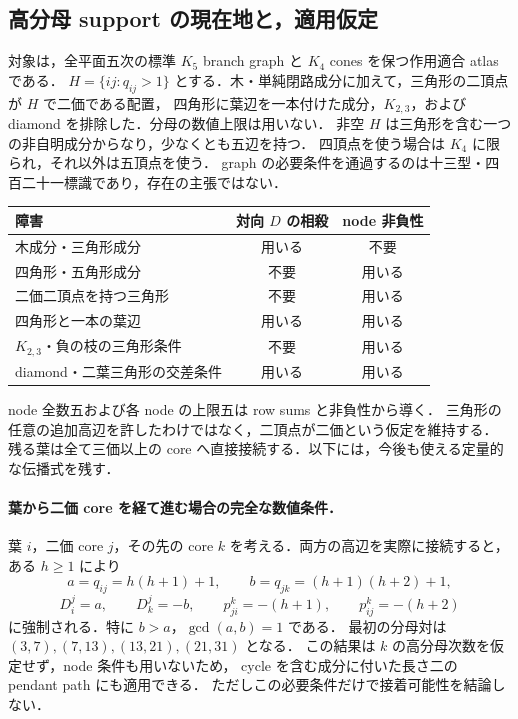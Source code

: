 \subsection{高分母 support の現在地と，適用仮定}
\label{ns15:current-support}

対象は，全平面五次の標準 $K_5$ branch graph と $K_4$ cones を保つ作用適合 atlas である．
$H=\{ij:q_{ij}>1\}$ とする．木・単純閉路成分に加えて，三角形の二頂点が $H$ で二価である配置，
四角形に葉辺を一本付けた成分，$K_{2,3}$，および diamond を排除した．分母の数値上限は用いない．
非空 $H$ は三角形を含む一つの非自明成分からなり，少なくとも五辺を持つ．
四頂点を使う場合は $K_4$ に限られ，それ以外は五頂点を使う．
graph の必要条件を通過するのは十三型・四百二十一標識であり，存在の主張ではない．

\begin{center}
\begin{tabular}{lcc}
障害 & 対向 $D$ の相殺 & node 非負性\\\hline
木成分・三角形成分 & 用いる & 不要\\
四角形・五角形成分 & 不要 & 用いる\\
二価二頂点を持つ三角形 & 不要 & 用いる\\
四角形と一本の葉辺 & 用いる & 用いる\\
$K_{2,3}$・負の枝の三角形条件 & 不要 & 用いる\\
diamond・二葉三角形の交差条件 & 用いる & 用いる
\end{tabular}
\end{center}
node 全数五および各 node の上限五は row sums と非負性から導く．
三角形の任意の追加高辺を許したわけではなく，二頂点が二価という仮定を維持する．
残る葉は全て三価以上の core へ直接接続する．以下には，今後も使える定量的な伝播式を残す．

\paragraph{葉から二価 core を経て進む場合の完全な数値条件．}
葉 $i$，二価 core $j$，その先の core $k$ を考える．両方の高辺を実際に接続すると，
ある $h\geq1$ により
\[
 a=q_{ij}=h(h+1)+1,\qquad b=q_{jk}=(h+1)(h+2)+1,
\]
\[
 D^j_i=a,\qquad D^j_k=-b,\qquad
 p^k_{ji}=-(h+1),\qquad p^k_{ij}=-(h+2)
\]
に強制される．特に $b>a$，$\gcd(a,b)=1$ である．
最初の分母対は $(3,7),(7,13),(13,21),(21,31)$ となる．
この結果は $k$ の高分母次数を仮定せず，node 条件も用いないため，
cycle を含む成分に付いた長さ二の pendant path にも適用できる．
ただしこの必要条件だけで接着可能性を結論しない．

